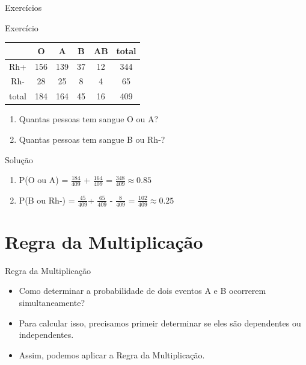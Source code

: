\documentclass{beamer}
\begin{document}
\begin{frame}{Exercícios}
  \begin{block}{Exercício}
    \begin{tabular}{ccccc|c}
      & O & A & B & AB & total\\
      \hline
      Rh+ & 156 & 139 & 37 & 12 & 344\\
      Rh- & 28 & 25 & 8 & 4 & 65\\
      \hline
      total & 184 & 164 & 45 & 16 & 409\\
    \end{tabular}
    \begin{enumerate}
    \item<1-> Quantas pessoas tem sangue O ou A?
    \item<1-> Quantas pessoas tem sangue B ou Rh-?
    \end{enumerate}
  \end{block}
  \begin{block}{Solução}
    \begin{enumerate}
    \item P(O ou A) = $\frac{184}{409}$ + $\frac{164}{409}$ =
      $\frac{348}{409} \approx 0.85$
    \item P(B ou Rh-) = $\frac{45}{409}$+ $\frac{65}{409}$ -
      $\frac{8}{409}$ = $\frac{102}{409} \approx 0.25$
    \end{enumerate}
  \end{block}
\end{frame}

\section{Regra da Multiplicação}


\begin{frame}{Regra da Multiplicação}
  \begin{itemize}
  \item Como determinar a probabilidade de dois eventos A e B
    ocorrerem simultaneamente?
  \item Para calcular isso, precisamos primeir determinar se eles são
    \alert{dependentes} ou \alert{independentes}.
  \item Assim, podemos aplicar a Regra da Multiplicação.
  \end{itemize}
\end{frame}
\end{document}
